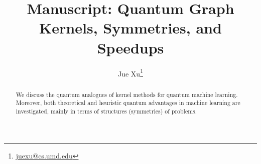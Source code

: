 \documentclass[11pt]{article}
\title{Manuscript: Quantum Graph Kernels, Symmetries, and Speedups}
\author{Jue Xu\footnote{\href{mailto:juexu@cs.umd.edu}{ juexu@cs.umd.edu}} }
\theoremstyle{plain}
\theoremstyle{definition}
\begin{document}
\maketitle
\begin{abstract}
	We discuss the quantum analogues of kernel methods for quantum machine learning.
	Moreover, both theoretical and heuristic quantum advantages in machine learning are investigated, mainly in terms of structures (symmetries) of problems.
\end{abstract}

\setcounter{tocdepth}{2}
\tableofcontents


% 
% 
% 
% 
% 
% 
% 
% 





% 
% 
% 
% 
\end{document}
